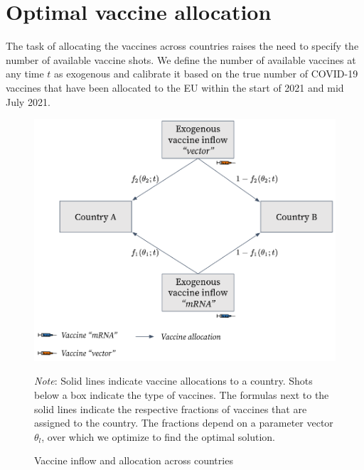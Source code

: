 \section{Optimal vaccine allocation}\label{sec:vaccine_allocation}
The task of allocating the vaccines across countries raises the need to specify the number of available vaccine shots. We define the number of available vaccines at any time $t$ as exogenous and calibrate it based on the true number of COVID-19 vaccines that have been allocated to the EU within the start of 2021 and mid July 2021.
\begin{figure}[h!]
\centering
\includegraphics[scale=0.3]{images/overview_vaccine_inflow.png}\\
\begin{flushleft}
\scriptsize{\textit{Note}: Solid lines indicate vaccine allocations to a country. Shots below a box indicate the type of vaccines. The formulas next to the solid lines indicate the respective fractions of vaccines that are assigned to the country. The fractions depend on a parameter vector $\theta_l$, over which we optimize to find the optimal solution.}
\end{flushleft}
\caption{Vaccine inflow and allocation across countries}
\label{fig:model_vaccine_allocation}
\end{figure}

